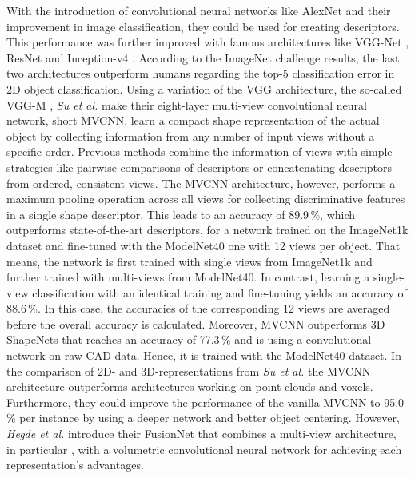 With the introduction of convolutional neural networks like AlexNet \cite{Krizhevsky:2012:ICD:2999134.2999257} and their improvement in image classification, they could be used for creating descriptors.
This performance was further improved with famous architectures like VGG-Net \cite{Simonyan15}, ResNet \cite{He2016ResNet} and Inception-v4 \cite{SzegedyInceptionv4}.
According to the ImageNet challenge \cite{Russakovsky:2015:ILS:2846547.2846559} results, the last two architectures outperform humans regarding the top-5 classification error in 2D object classification.
Using a variation of the VGG architecture, the so-called VGG-M \cite{journals/corr/ChatfieldSVZ14}, \textit{Su et al.} \cite{Su:2015:MCN:2919332.2919750} make their eight-layer multi-view convolutional neural network, short MVCNN, learn a compact shape representation of the actual object by collecting information from any number of input views without a specific order.
Previous methods combine the information of views with simple strategies like pairwise comparisons of descriptors or concatenating descriptors from ordered, consistent views.
The MVCNN architecture, however, performs a maximum pooling operation across all views for collecting discriminative features in a single shape descriptor.
This leads to an accuracy of 89.9\,\%, which outperforms state-of-the-art descriptors, for a network trained on the ImageNet1k dataset \cite{Krizhevsky:2012:ICD:2999134.2999257} and fine-tuned with the ModelNet40 one \cite{conf/cvpr/WuSKYZTX15} with 12 views per object.
That means, the network is first trained with single views from ImageNet1k and further trained with multi-views from ModelNet40.
In contrast, learning a single-view classification with an identical training and fine-tuning yields an accuracy of 88.6\,\%.
In this case, the accuracies of the corresponding 12 views are averaged before the overall accuracy is calculated.
Moreover, MVCNN outperforms 3D ShapeNets \cite{conf/cvpr/WuSKYZTX15} that reaches an accuracy of 77.3\,\% and is using a convolutional network on raw CAD data.
Hence, it is trained with the ModelNet40 dataset.
In the comparison of 2D- and 3D-representations from \textit{Su et al.} \cite{Su2018} the MVCNN architecture outperforms architectures working on point clouds and voxels.
Furthermore, they could improve the performance of the vanilla MVCNN to 95.0\,\% per instance by using a deeper network and better object centering.
However, \textit{Hegde et al.} introduce their FusionNet \cite{Hegde2016FusionNet3O} that combines a multi-view architecture, in particular \cite{Su:2015:MCN:2919332.2919750}, with a volumetric convolutional neural network for achieving each representation's advantages.
